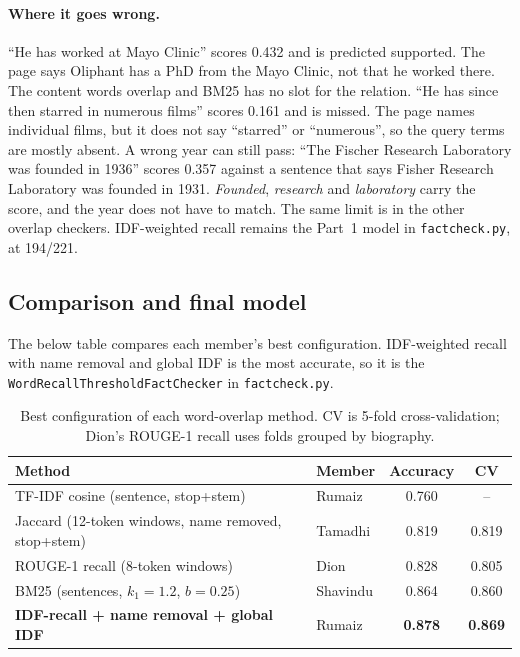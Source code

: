 \documentclass[12pt,a4paper]{article}
\begin{document}
\paragraph{Where it goes wrong.}
``He has worked at Mayo Clinic'' scores 0.432 and is predicted supported. The page says Oliphant has a PhD from the Mayo Clinic, not that he worked there. The content words overlap and BM25 has no slot for the relation. ``He has since then starred in numerous films'' scores 0.161 and is missed. The page names individual films, but it does not say ``starred'' or ``numerous'', so the query terms are mostly absent. A wrong year can still pass: ``The Fischer Research Laboratory was founded in 1936'' scores 0.357 against a sentence that says Fisher Research Laboratory was founded in 1931. \textit{Founded}, \textit{research} and \textit{laboratory} carry the score, and the year does not have to match. The same limit is in the other overlap checkers. IDF-weighted recall remains the Part~1 model in \texttt{factcheck.py}, at 194/221.

\subsection{Comparison and final model}
\label{sec:p1final}
The below table compares each member's best configuration. IDF-weighted recall with name removal and global IDF is the most accurate, so it is the \texttt{WordRecallThresholdFactChecker} in \texttt{factcheck.py}.

\begin{table}[H]
\centering
\begin{tabular}{llcc}
\toprule
Method & Member & Accuracy & CV \\
\midrule
TF-IDF cosine (sentence, stop+stem) & Rumaiz & 0.760 & -- \\
Jaccard (12-token windows, name removed, stop+stem) & Tamadhi & 0.819 & 0.819 \\
ROUGE-1 recall (8-token windows) & Dion & 0.828 & 0.805 \\
BM25 (sentences, $k_1{=}1.2$, $b{=}0.25$) & Shavindu & 0.864 & 0.860 \\
\textbf{IDF-recall + name removal + global IDF} & Rumaiz & \textbf{0.878} & \textbf{0.869} \\
\bottomrule
\end{tabular}
\caption{Best configuration of each word-overlap method. CV is 5-fold cross-validation; Dion's ROUGE-1 recall uses folds grouped by biography.}
\label{tab:methods}
\end{table}
\end{document}
